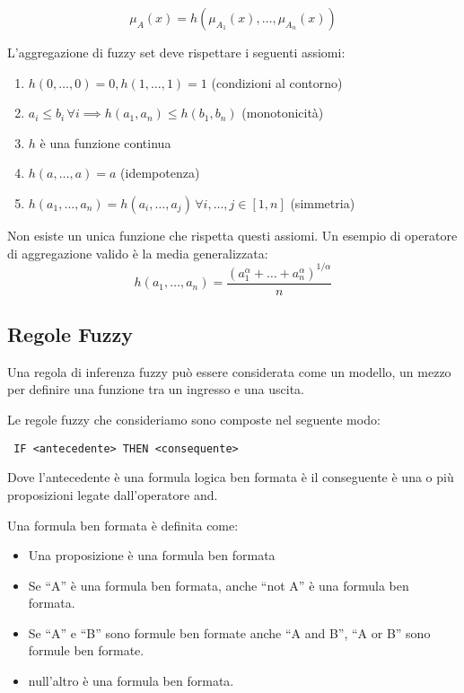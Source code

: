 \begin{equation*}
   \mu_A(x) = h(\mu_{A_1}(x), \dots, \mu_{A_n}(x))
\end{equation*}

L'aggregazione di fuzzy set deve rispettare i seguenti assiomi:

\begin{enumerate}
 \item $h(0, \dots, 0)=0, h(1, \dots, 1)=1 $ (condizioni al contorno)
 \item $a_i \leq b_i\, \forall i \implies h(a_1, a_n) \leq h(b_1, b_n)$ (monotonicità)
 \item $h$ è una funzione continua
 \item $h(a, \dots,a)=a$ (idempotenza)
 \item $h(a_1,\dots,a_n) = h(a_i, \dots, a_j)\, \forall i,\dots, j\in [1,n]$ (simmetria) %
\end{enumerate}

Non esiste un unica funzione che rispetta questi assiomi. Un esempio di operatore di aggregazione valido è la media generalizzata:
\begin{equation*}
 h(a_1, \dots, a_n) = \dfrac{(a_1^\alpha + \dots + a_n^\alpha)^{1/\alpha}}{n}
\end{equation*}



\subsection{Regole Fuzzy}

Una regola di inferenza fuzzy può essere considerata come un modello, un mezzo per definire una funzione tra un ingresso e una uscita.

Le regole fuzzy che consideriamo sono composte nel seguente modo:
\begin{verbatim}
 IF <antecedente> THEN <consequente>
\end{verbatim}

Dove l'antecedente è una formula logica ben formata è il conseguente è una o più proposizioni legate dall'operatore and.

Una formula ben formata è definita come:

\begin{itemize}
 \item Una proposizione è una formula ben formata
 \item Se ``A'' è una formula ben formata, anche ``not A'' è una formula ben formata.
 \item Se ``A'' e ``B'' sono formule ben formate anche ``A and B'', ``A or B'' sono formule ben formate.
 \item null'altro è una formula ben formata.
\end{itemize}

